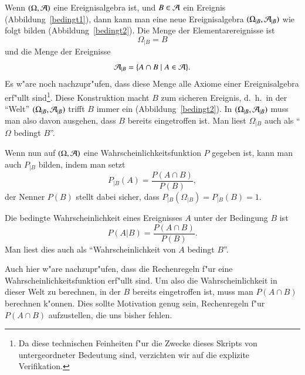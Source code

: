 Wenn $(\Omega, {\cal A})$ eine Ereignisalgebra ist, und 
$B\in{\cal A}$ ein Ereignis (Abbildung~\ref{bedingt1}),
dann kann man eine neue Ereignisalgebra
$(\Omega_{|B}, {\cal A}_{|B})$ wie folgt bilden (Abbildung~\ref{bedingt2}).
Die Menge der Elementarereignisse ist
\[
\Omega_{|B}=B
\]
und die Menge der Ereignisse
\[
{\cal A}_{|B}=\{A\cap B\;|\; A\in{\cal A}\}.
\]
Es w"are noch nachzupr"ufen, dass diese Menge alle Axiome einer
Ereignisalgebra erf"ullt sind\footnote{Da diese technischen Feinheiten 
f"ur die Zwecke dieses Skripts von untergeordneter Bedeutung sind, verzichten
wir auf die explizite Verifikation.}.
Diese Konstruktion macht $B$ zum sicheren Ereignis, d.~h.~in der ``Welt''
$(\Omega_{|B},{\cal A}_{|B})$ trifft $B$ immer ein (Abbildung~\ref{bedingt2}).
In $(\Omega_{|B},{\cal A}_{|B})$ muss man also davon ausgehen, dass $B$
bereits eingetroffen ist.
Man liest $\Omega_{|B}$ auch als ``$\Omega$ bedingt $B$''.

Wenn nun auf $(\Omega, {\cal A})$ eine Wahrscheinlichkeitsfunktion $P$
gegeben ist, kann man auch $P_{|B}$ bilden, indem man setzt
\begin{equation*}
P_{|B}(A)=\frac{P(A\cap B)}{P(B)},
\end{equation*}
der Nenner $P(B)$ stellt dabei sicher, dass $P_{|B}(\Omega_{|B})=P_{|B}(B)=1$.

\begin{definition}
\label{def-bedingte-wahrscheinlichkeit}
Die bedingte Wahrscheinlichkeit eines Ereignisses $A$ unter der Bedingung
$B$ ist
\[
P(A|B)=\frac{P(A\cap B)}{P(B)}.
\]
Man liest dies auch als ``Wahrscheinlichkeit von $A$ bedingt $B$''.
\end{definition}

Auch hier w"are nachzupr"ufen, dass die Rechenregeln f"ur eine
Wahrscheinlichkeitsfunktion erf"ullt sind.
Um also die Wahrscheinlichkeit in dieser Welt zu berechnen,
in der $B$ bereits eingetroffen ist, 
muss man $P(A\cap B)$ berechnen k"onnen.
Dies sollte Motivation genug sein, Rechenregeln f"ur
$P(A\cap B)$ aufzustellen, die uns bisher fehlen.

